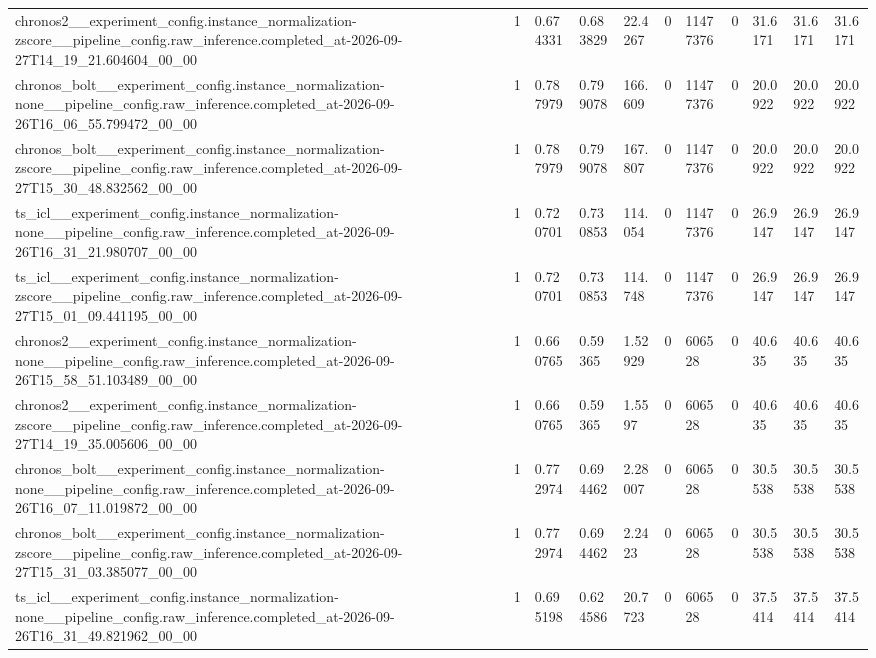 \begin{tabular}{lllllllllll}
chronos2\_\_experiment\_config.instance\_normalization-zscore\_\_pipeline\_config.raw\_inference.completed\_at-2026-09-27T14\_19\_21.604604\_00\_00 & 1 & 0.674331 & 0.683829 & 22.4267 & 0 & 11477376 & 0 & 31.6171 & 31.6171 & 31.6171 \\
chronos\_bolt\_\_experiment\_config.instance\_normalization-none\_\_pipeline\_config.raw\_inference.completed\_at-2026-09-26T16\_06\_55.799472\_00\_00 & 1 & 0.787979 & 0.799078 & 166.609 & 0 & 11477376 & 0 & 20.0922 & 20.0922 & 20.0922 \\
chronos\_bolt\_\_experiment\_config.instance\_normalization-zscore\_\_pipeline\_config.raw\_inference.completed\_at-2026-09-27T15\_30\_48.832562\_00\_00 & 1 & 0.787979 & 0.799078 & 167.807 & 0 & 11477376 & 0 & 20.0922 & 20.0922 & 20.0922 \\
ts\_icl\_\_experiment\_config.instance\_normalization-none\_\_pipeline\_config.raw\_inference.completed\_at-2026-09-26T16\_31\_21.980707\_00\_00 & 1 & 0.720701 & 0.730853 & 114.054 & 0 & 11477376 & 0 & 26.9147 & 26.9147 & 26.9147 \\
ts\_icl\_\_experiment\_config.instance\_normalization-zscore\_\_pipeline\_config.raw\_inference.completed\_at-2026-09-27T15\_01\_09.441195\_00\_00 & 1 & 0.720701 & 0.730853 & 114.748 & 0 & 11477376 & 0 & 26.9147 & 26.9147 & 26.9147 \\
chronos2\_\_experiment\_config.instance\_normalization-none\_\_pipeline\_config.raw\_inference.completed\_at-2026-09-26T15\_58\_51.103489\_00\_00 & 1 & 0.660765 & 0.59365 & 1.52929 & 0 & 606528 & 0 & 40.635 & 40.635 & 40.635 \\
chronos2\_\_experiment\_config.instance\_normalization-zscore\_\_pipeline\_config.raw\_inference.completed\_at-2026-09-27T14\_19\_35.005606\_00\_00 & 1 & 0.660765 & 0.59365 & 1.5597 & 0 & 606528 & 0 & 40.635 & 40.635 & 40.635 \\
chronos\_bolt\_\_experiment\_config.instance\_normalization-none\_\_pipeline\_config.raw\_inference.completed\_at-2026-09-26T16\_07\_11.019872\_00\_00 & 1 & 0.772974 & 0.694462 & 2.28007 & 0 & 606528 & 0 & 30.5538 & 30.5538 & 30.5538 \\
chronos\_bolt\_\_experiment\_config.instance\_normalization-zscore\_\_pipeline\_config.raw\_inference.completed\_at-2026-09-27T15\_31\_03.385077\_00\_00 & 1 & 0.772974 & 0.694462 & 2.2423 & 0 & 606528 & 0 & 30.5538 & 30.5538 & 30.5538 \\
ts\_icl\_\_experiment\_config.instance\_normalization-none\_\_pipeline\_config.raw\_inference.completed\_at-2026-09-26T16\_31\_49.821962\_00\_00 & 1 & 0.695198 & 0.624586 & 20.7723 & 0 & 606528 & 0 & 37.5414 & 37.5414 & 37.5414 \\

\end{tabular}
